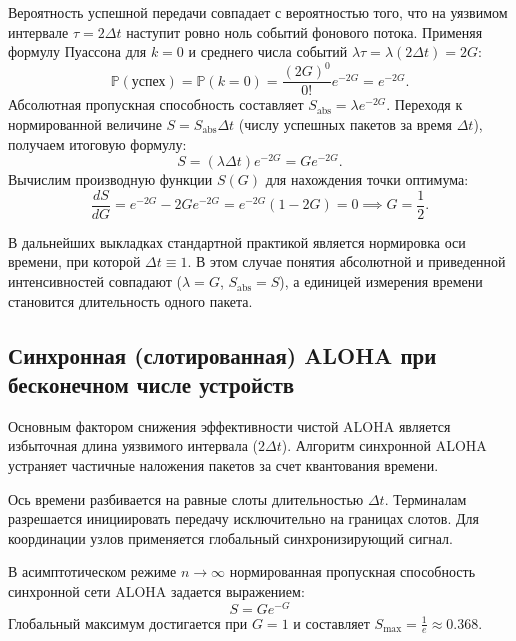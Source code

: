 \begin{sproof}
Вероятность успешной передачи совпадает с вероятностью того, что на уязвимом интервале $\tau = 2\Delta t$ наступит ровно ноль событий фонового потока. Применяя формулу Пуассона для $k=0$ и среднего числа событий $\lambda \tau = \lambda(2\Delta t) = 2G$:
$$\mathbb{P}(\text{успех}) = \mathbb{P}(k=0) = \frac{(2G)^0}{0!} e^{-2G} = e^{-2G}.$$
Абсолютная пропускная способность составляет $S_{\text{abs}} = \lambda e^{-2G}$. Переходя к нормированной величине $S = S_{\text{abs}} \Delta t$ (числу успешных пакетов за время $\Delta t$), получаем итоговую формулу:
$$S = (\lambda \Delta t) e^{-2G} = G e^{-2G}.$$
Вычислим производную функции $S(G)$ для нахождения точки оптимума:
$$\frac{dS}{dG} = e^{-2G} - 2Ge^{-2G} = e^{-2G}(1 - 2G) = 0 \implies G = \frac{1}{2}.$$
\end{sproof}

\begin{note}
В дальнейших выкладках стандартной практикой является нормировка оси времени, при которой $\Delta t \equiv 1$. В этом случае понятия абсолютной и приведенной интенсивностей совпадают ($\lambda = G$, $S_{\text{abs}} = S$), а единицей измерения времени становится длительность одного пакета.
\end{note}

\subsection{Синхронная (слотированная) ALOHA при бесконечном числе устройств}

Основным фактором снижения эффективности чистой ALOHA является избыточная длина уязвимого интервала ($2\Delta t$). Алгоритм синхронной ALOHA устраняет частичные наложения пакетов за счет квантования времени.

Ось времени разбивается на равные слоты длительностью $\Delta t$. Терминалам разрешается инициировать передачу исключительно на границах слотов. Для координации узлов применяется глобальный синхронизирующий сигнал.

\begin{statement}
В асимптотическом режиме $n \to \infty$ нормированная пропускная способность синхронной сети ALOHA задается выражением:
$$S = G e^{-G}$$
Глобальный максимум достигается при $G = 1$ и составляет $S_{\max} = \frac{1}{e} \approx 0.368$.
\end{statement}

